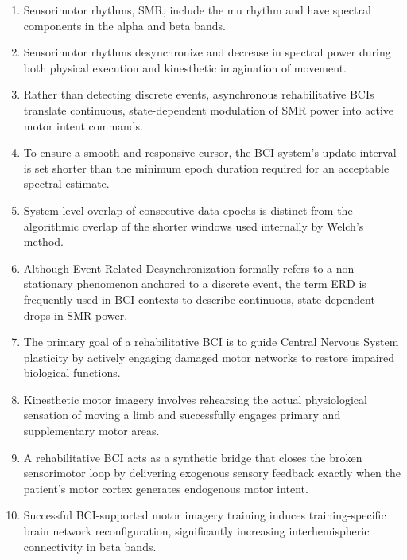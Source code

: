 \begin{enumerate}[label=\arabic*.]
    \item Sensorimotor rhythms, SMR, include the mu rhythm and have spectral components in the alpha and beta bands.
    
    \item Sensorimotor rhythms desynchronize and decrease in spectral power during both physical execution and kinesthetic imagination of movement.
    
    \item Rather than detecting discrete events, asynchronous rehabilitative BCIs translate continuous, state-dependent modulation of SMR power into active motor intent commands.
    
    \item To ensure a smooth and responsive cursor, the BCI system's update interval is set shorter than the minimum epoch duration required for an acceptable spectral estimate.
    
    \item System-level overlap of consecutive data epochs is distinct from the algorithmic overlap of the shorter windows used internally by Welch's method.
    
    \item Although Event-Related Desynchronization formally refers to a non-stationary phenomenon anchored to a discrete event, the term ERD is frequently used in BCI contexts to describe continuous, state-dependent drops in SMR power.
    
    \item The primary goal of a rehabilitative BCI is to guide Central Nervous System plasticity by actively engaging damaged motor networks to restore impaired biological functions.
    
    \item Kinesthetic motor imagery involves rehearsing the actual physiological sensation of moving a limb and successfully engages primary and supplementary motor areas.
    
    \item A rehabilitative BCI acts as a synthetic bridge that closes the broken sensorimotor loop by delivering exogenous sensory feedback exactly when the patient's motor cortex generates endogenous motor intent.
    
    \item Successful BCI-supported motor imagery training induces training-specific brain network reconfiguration, significantly increasing interhemispheric connectivity in beta bands.
\end{enumerate}

